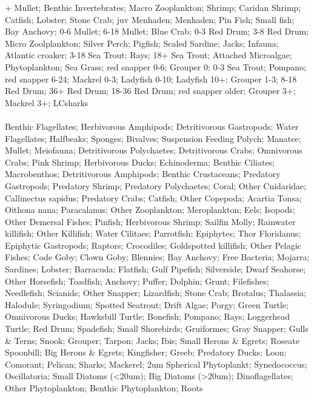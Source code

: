 + Mullet; Benthic Invertebrates; Macro Zooplankton; Shrimp; Caridan Shrimp; Catfish; Lobster; Stone Crab; juv Menhaden; Menhaden; Pin Fish; Small fish; Bay Anchovy; 0-6 Mullet; 6-18 Mullet; Blue Crab; 0-3 Red Drum; 3-8 Red Drum; Micro Zoolplankton; Silver Perch; Pigfish; Scaled Sardine; Jacks; Infauna; Atlantic croaker; 3-18 Sea Trout; Rays; 18+ Sea Trout; Attached Microalgae; Phytoplankton; Sea Grass; red snapper 0-6; Grouper 0; 0-3 Sea Trout; Pompano; red snapper 6-24; Mackrel 0-3; Ladyfish 0-10; Ladyfish 10+; Grouper 1-3; 8-18 Red Drum; 36+ Red Drum; 18-36 Red Drum; red snapper older; Grouper 3+; Mackrel 3+; LCsharks\\
\fullhline
\hline
{} \\
\hline
Benthic Flagellates; Herbivorous Amphipods; Detritivorous Gastropods; Water Flagellates; Halfbeaks; Sponges; Bivalves; Suspension Feeding Polych; Manatee; Mullet; Meiofauna; Detritivorous Polychaetes; Detritivorous Crabs; Omnivorous Crabs; Pink Shrimp; Herbivorous Ducks; Echinoderma; Benthic Ciliates; Macrobenthos; Detritivorous Amphipods; Benthic Crustaceans; Predatory Gastropods; Predatory Shrimp; Predatory Polychaetes; Coral; Other Cnidaridae; Callinectus sapidus; Predatory Crabs; Catfish; Other Copepoda; Acartia Tonsa; Oithona nana; Paracalanus; Other Zooplankton; Meroplankton; Eels; Isopods; Other Demersal Fishes; Pinfish; Herbivorous Shrimp; Sailfin Molly; Rainwater killifish; Other Killifish; Water Cilitaes; Parrotfish; Epiphytes; Thor Floridanus; Epiphytic Gastropods; Raptors; Crocodiles; Goldspotted killifish; Other Pelagic Fishes; Code Goby; Clown Goby; Blennies; Bay Anchovy; Free Bacteria; Mojarra; Sardines; Lobster; Barracuda; Flatfish; Gulf Pipefish; Silverside; Dwarf Seahorse; Other Horsefish; Toadfish; Anchovy; Puffer; Dolphin; Grunt; Filefishes; Needlefish; Scianids; Other Snapper; Lizardfish; Stone Crab; Brotalus; Thalassia; Halodule; Syringodium; Spotted Seatrout; Drift Algae; Porgy; Green Turtle; Omnivorous Ducks; Hawksbill Turtle; Bonefish; Pompano; Rays; Loggerhead Turtle; Red Drum; Spadefish; Small Shorebirds; Gruiformes; Gray Snapper; Gulls \& Terns; Snook; Grouper; Tarpon; Jacks; Ibis; Small Herons \& Egrets; Roseate Spoonbill; Big Herons \& Egrets; Kingfisher; Greeb; Predatory Ducks; Loon; Comorant; Pelican; Sharks; Mackerel; 2um Spherical Phytoplankt; Synedococcus; Oscillatoria; Small Diatoms (<20um); Big Diatoms (>20um); Dinoflagellates; Other Phytoplankton; Benthic Phytoplankton; Roots\\
